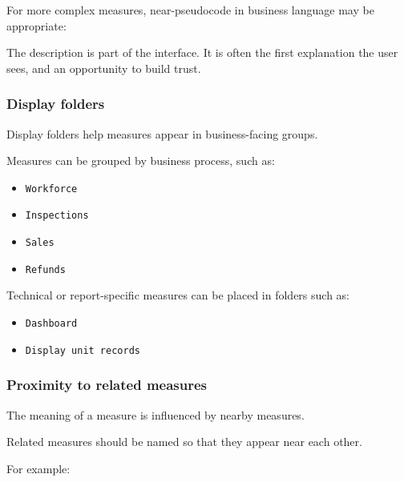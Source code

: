 \documentclass[10pt,openany,10pt]{book}
\providecommand{\tightlist}{%
  \setlength{\itemsep}{0pt}\setlength{\parskip}{0pt}}
\begin{document}
For more complex measures, near-pseudocode in business language may be
appropriate:

\begin{Shaded}
\begin{Highlighting}[]
\end{Highlighting}
\end{Shaded}

The description is part of the interface. It is often the first
explanation the user sees, and an opportunity to build trust.

\subsubsection{Display folders}\label{display-folders}

Display folders help measures appear in business-facing groups.

Measures can be grouped by business process, such as:

\begin{itemize}
\tightlist
\item
  \texttt{Workforce}
\item
  \texttt{Inspections}
\item
  \texttt{Sales}
\item
  \texttt{Refunds}
\end{itemize}

Technical or report-specific measures can be placed in folders such as:

\begin{itemize}
\tightlist
\item
  \texttt{Dashboard}
\item
  \texttt{Display\ unit\ records}
\end{itemize}

\subsubsection{Proximity to related
measures}\label{proximity-to-related-measures}

The meaning of a measure is influenced by nearby measures.

Related measures should be named so that they appear near each other.

For example:
\end{document}
